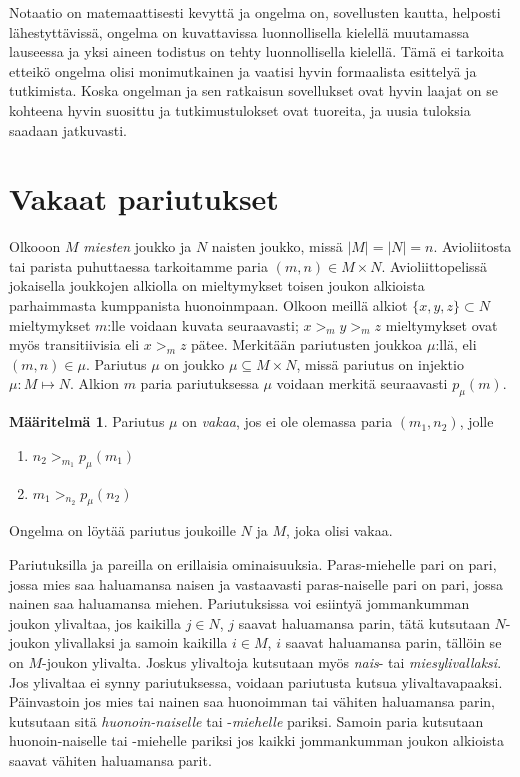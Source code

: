 \documentclass[finnish]{tktltiki2}
\theoremstyle{definition}
\newtheorem{maar}[lau]{Määritelmä}
\theoremstyle{remark}
\begin{document}
Notaatio on matemaattisesti kevyttä ja ongelma on, sovellusten kautta, helposti lähestyttävissä, ongelma on kuvattavissa luonnollisella kielellä muutamassa lauseessa ja yksi aineen todistus on tehty luonnollisella kielellä. Tämä ei tarkoita etteikö ongelma olisi monimutkainen ja vaatisi hyvin formaalista esittelyä ja tutkimista. Koska ongelman ja sen ratkaisun sovellukset ovat hyvin laajat on se kohteena hyvin suosittu ja tutkimustulokset ovat tuoreita, ja uusia tuloksia saadaan jatkuvasti.


\section{Vakaat pariutukset}
Olkooon $M$ \emph{miesten} joukko ja $N$ naisten joukko, missä $|M| = |N| = n$. Avioliitosta tai parista puhuttaessa tarkoitamme paria $(m, n) \in M \times N$. Avioliittopelissä jokaisella joukkojen alkiolla on mieltymykset toisen joukon alkioista parhaimmasta kumppanista huonoinmpaan. Olkoon meillä alkiot $\{x, y, z\} \subset N$ mieltymykset $m$:lle voidaan kuvata seuraavasti; $x >_m y >_m z$ mieltymykset ovat myös transitiivisia eli $x >_m z$ pätee. Merkitään pariutusten joukkoa $\mu$:llä, eli $(m,n) \in \mu$. Pariutus $\mu$ on joukko $\mu \subseteq M \times N$, missä pariutus on injektio $\mu : M \mapsto N$. Alkion $m$ paria pariutuksessa $\mu$ voidaan merkitä seuraavasti $p_{\mu}(m)$.

\begin{maar}
Pariutus $\mu$ on \emph{vakaa}, jos ei ole olemassa paria $(m_1, n_2)$, jolle
\begin{enumerate}
	\item $n_2 >_{m_{1}} p_{\mu}(m_1)$
	\item $m_1 >_{n_{2}} p_{\mu}(n_2)$
\end{enumerate}
Ongelma on löytää pariutus joukoille $N$ ja $M$, joka olisi vakaa.
\end{maar}
Pariutuksilla ja pareilla on erillaisia ominaisuuksia. Paras-miehelle pari on pari, jossa mies saa haluamansa naisen ja vastaavasti paras-naiselle pari on pari, jossa nainen saa haluamansa miehen. Pariutuksissa voi esiintyä jommankumman joukon ylivaltaa, jos kaikilla $j \in N$, $j$ saavat haluamansa parin, tätä kutsutaan $N$-joukon ylivallaksi ja samoin kaikilla $i \in M$, $i$ saavat haluamansa parin, tällöin se on $M$-joukon ylivalta. Joskus ylivaltoja kutsutaan myös \emph{nais}- tai \emph{miesylivallaksi}. Jos ylivaltaa ei synny pariutuksessa, voidaan pariutusta kutsua ylivaltavapaaksi.
Päinvastoin jos mies tai nainen saa huonoimman tai vähiten haluamansa parin, kutsutaan sitä \emph{huonoin-naiselle} tai -\emph{miehelle} pariksi. Samoin paria kutsutaan huonoin-naiselle tai -miehelle pariksi jos kaikki jommankumman joukon alkioista saavat vähiten haluamansa parit.
\end{document}
